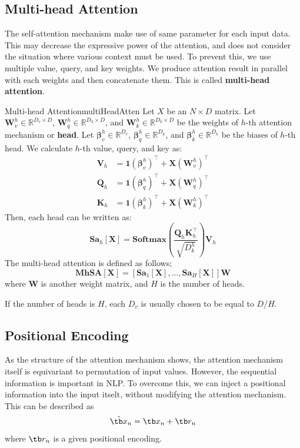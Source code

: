 \documentclass{article}
\begin{document}
    \subsection{Multi-head Attention}
        The self-attention mechanism make use of same parameter for each input data.
        This may decrease the expressive power of the attention, and does not consider
        the situation where various context must be used.
        To prevent this, we use multiple value, query, and key weights.
        We produce attention result in parallel with each weights and then concatenate them.
        This is called \textbf{multi-head attention}.
        \begin{defn}{Multi-head Attention}{multiHeadAtten}
            Let $X$ be an $N \times D$ matrix.
            Let $\textbf{W}_v^h \in \mathbb{R}^{D_v \times D}$, $\textbf{W}_q^h \in \mathbb{R}^{D_k \times D}$,
            and $\textbf{W}_k^h \in \mathbb{R}^{D_k \times D}$ be the weights of $h$-th attention mechanism or \textbf{head}.
            Let $\bm{\beta}_v^h \in \mathbb{R}^{D_v}$, $\bm{\beta}_q^h \in \mathbb{R}^{D_k}$,
            and $\bm{\beta}_k^h \in \mathbb{R}^{D_k}$ be the biases of $h$-th head.
            We calculate $h$-th value, query, and key as:
            \begin{align*}
                \textbf{V}_h &= \textbf{1}(\bm{\beta}_v^h)^{\top} + \textbf{X}(\textbf{W}_v^h)^{\top}\\
                \textbf{Q}_h &= \textbf{1}(\bm{\beta}_q^h)^{\top} + \textbf{X}(\textbf{W}_q^h)^{\top}\\
                \textbf{K}_h &= \textbf{1}(\bm{\beta}_k^h)^{\top} + \textbf{X}(\textbf{W}_k^h)^{\top}
            \end{align*}
            Then, each head can be written as:
            \[
                \textbf{Sa}_h[\textbf{X}]=\textbf{Softmax}\left(\frac{\textbf{Q}_h\textbf{K}_h^{\top}}{\sqrt{D_k^h}}\right)\textbf{V}_h
            \]
            The multi-head attention is defined as follows;
            \[
                \textbf{MhSA}[\textbf{X}] = [\textbf{Sa}_1[\textbf{X}], \dots, \textbf{Sa}_H[\textbf{X}]]\textbf{W}
            \]
            where \textbf{W} is another weight matrix, and $H$ is the number of heads.
        \end{defn}
        If the number of heads is $H$, each $D_v$ is usually chosen to be equal to $D/H$.

    \subsection{Positional Encoding}
        As the structure of the attention mechanism shows, the attention mechanism itself is equivariant to
        permutation of input values. However, the sequential information is important in NLP. To overcome this,
        we can inject a positional information into the input itselt, without modifying the attention mechanism.
        This can be described as
        \[
        \tilde{\tb x}_n = \tb x_n + \tb r_n
        \]
        where $\tb r_n$ is a given positional encoding.
\end{document}
